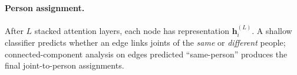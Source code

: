 \paragraph{Person assignment.}
After \(L\) stacked attention layers, each node has representation
\(\mathbf{h}_i^{(L)}\).
A shallow classifier predicts whether an edge links joints of the
\emph{same} or \emph{different} people;
connected-component analysis on edges predicted “same-person”
produces the final joint-to-person assignments.